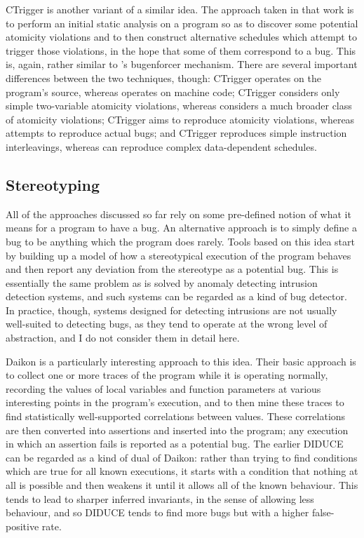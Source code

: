 CTrigger\cite{Zhou} is another variant of a similar idea.  The
approach taken in that work is to perform an initial static analysis
on a program so as to discover some potential atomicity violations and
to then construct alternative schedules which attempt to trigger those
violations, in the hope that some of them correspond to a bug.  This
is, again, rather similar to {\technique}'s \gls{bugenforcer}
mechanism.  There are several important differences between the two
techniques, though: CTrigger operates on the program's source, whereas
{\technique} operates on machine code; CTrigger considers only simple
two-variable atomicity violations, whereas {\technique} considers a
much broader class of atomicity violations; CTrigger aims to reproduce
atomicity violations, whereas {\technique} attempts to reproduce
actual bugs; and CTrigger reproduces simple instruction interleavings,
whereas {\technique} can reproduce complex data-dependent schedules.

\subsection{Stereotyping}
\label{sect:rw:stereotyping}

All of the approaches discussed so far rely on some pre-defined notion
of what it means for a program to have a bug.  An alternative approach
is to simply define a bug to be anything which the program does
rarely.  Tools based on this idea start by building up a model of how
a stereotypical execution of the program behaves and then report any
deviation from the stereotype as a potential bug.  This is essentially
the same problem as is solved by anomaly detecting intrusion detection
systems\cite{Forrest1996a}, and such systems can be regarded as a kind
of bug detector.  In practice, though, systems designed for detecting
intrusions are not usually well-suited to detecting bugs, as they tend
to operate at the wrong level of abstraction, and I do not consider
them in detail here.

Daikon\cite{Ernst2007} is a particularly interesting approach to this
idea.  Their basic approach is to collect one or more traces of the
program while it is operating normally, recording the values of local
variables and function parameters at various interesting points in the
program's execution, and to then mine these traces to find
statistically well-supported correlations between values.  These
correlations are then converted into assertions and inserted into the
program; any execution in which an assertion fails is reported as a
potential bug.  The earlier DIDUCE\cite{Hangal2002} can be regarded as
a kind of dual of Daikon: rather than trying to find conditions which
are true for all known executions, it starts with a condition that
nothing at all is possible and then weakens it until it allows all of
the known behaviour.  This tends to lead to sharper inferred
invariants, in the sense of allowing less behaviour, and so DIDUCE
tends to find more bugs but with a higher false-positive rate.

